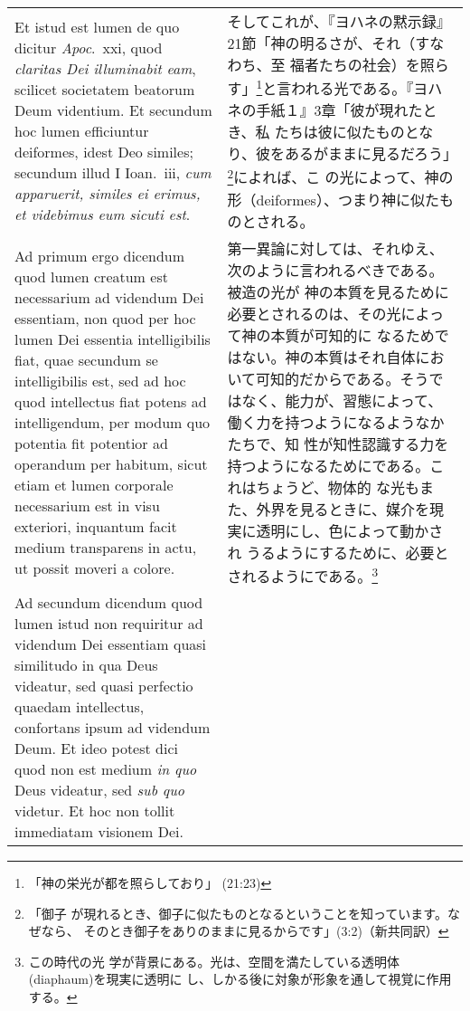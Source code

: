 \documentclass[10pt]{jsarticle} %
\begin{document}
\begin{longtable}{p{21em}p{21em}}
\\

Et istud est lumen de quo
dicitur {\it Apoc}.~{\sc xxi}, quod {\it claritas Dei illuminabit
eam}, scilicet societatem beatorum Deum videntium. Et secundum hoc
lumen efficiuntur deiformes, idest Deo similes; secundum illud I
Ioan.\ {\sc iii}, {\it cum apparuerit, similes ei erimus, et videbimus
eum sicuti est}.

&


そしてこれが、『ヨハネの黙示録』21節「神の明るさが、それ（すなわち、至
福者たちの社会）を照らす」\footnote{「神の栄光が都を照らしており」
(21:23)}と言われる光である。『ヨハネの手紙１』3章「彼が現れたとき、私
たちは彼に似たものとなり、彼をあるがままに見るだろう」\footnote{「御子
が現れるとき、御子に似たものとなるということを知っています。なぜなら、
そのとき御子をありのままに見るからです」(3:2)（新共同訳）}によれば、こ
の光によって、神の形（deiformes）、つまり神に似たものとされる。


\\


{\sc Ad primum ergo dicendum} quod lumen creatum est necessarium ad
videndum Dei essentiam, non quod per hoc lumen Dei essentia
intelligibilis fiat, quae secundum se intelligibilis est, sed ad hoc
quod intellectus fiat potens ad intelligendum, per modum quo potentia
fit potentior ad operandum per habitum, sicut etiam et lumen corporale
necessarium est in visu exteriori, inquantum facit medium transparens
in actu, ut possit moveri a colore.

&

第一異論に対しては、それゆえ、次のように言われるべきである。被造の光が
神の本質を見るために必要とされるのは、その光によって神の本質が可知的に
なるためではない。神の本質はそれ自体において可知的だからである。そうで
はなく、能力が、習態によって、働く力を持つようになるようなかたちで、知
性が知性認識する力を持つようになるためにである。これはちょうど、物体的
な光もまた、外界を見るときに、媒介を現実に透明にし、色によって動かされ
うるようにするために、必要とされるようにである。\footnote{この時代の光
学が背景にある。光は、空間を満たしている透明体(diaphaum)を現実に透明に
し、しかる後に対象が形象を通して視覚に作用する。}

\\


{\sc Ad secundum dicendum} quod lumen istud non requiritur ad videndum
Dei essentiam quasi similitudo in qua Deus videatur, sed quasi
perfectio quaedam intellectus, confortans ipsum ad videndum Deum. Et
ideo potest dici quod non est medium {\it in quo} Deus videatur, sed
{\it sub quo} videtur. Et hoc non tollit immediatam visionem Dei.



\end{longtable}
\end{document}
